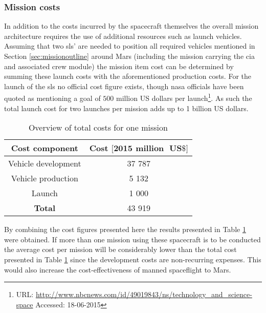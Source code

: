 \subsubsection{Mission costs}

In addition to the costs incurred by the spacecraft themselves the overall mission architecture requires the use of additional resources such as launch vehicles. Assuming that two \gls{sls}' are needed to position all required vehicles mentioned in Section \ref{sec:missionoutline} around Mars (including the mission carrying the \gls{cia} and associated crew module) the mission item cost can be determined by summing these launch costs with the aforementioned production costs. For the launch of the \gls{sls} no official cost figure exists, though \gls{nasa} officials have been quoted as mentioning a goal of $500$ million US dollars per launch\footnote{URL: \url{http://www.nbcnews.com/id/49019843/ns/technology_and_science-space} Accessed: 18-06-2015}. As such the total launch cost for two launches per mission adds up to 1 billion US dollars.


\begin{table}[H]
	\centering
	\caption{Overview of total costs for one mission}
	\begin{tabular}{|c|c|}
		\hline
		\textbf{Cost component} & \textbf{Cost $\mathbf{[2015}$ $\mathbf{million \mbox{ } US\$]}$} \\ \hline 
		\hline
		Vehicle development & 37 787 \\
		Vehicle production & 5 132\\
		Launch & 1 000\\ \hline
		\textbf{Total} & 43 919\\ \hline
	\end{tabular}
	\label{tab:missioncosts}
\end{table}

By combining the cost figures presented here the results presented in Table \ref{tab:missioncosts} were obtained. If more than one mission using these spacecraft is to be conducted the average cost per mission will be considerably lower than the total cost presented in Table \ref{tab:missioncosts} since the development costs are non-recurring expenses. This would also increase the cost-effectiveness of manned spaceflight to Mars.